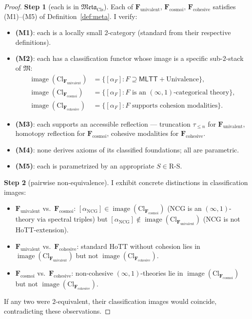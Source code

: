 \documentclass[11pt]{article}
\theoremstyle{plain}
\theoremstyle{definition}
\newcommand{\RS}{\mathrm{R\text{-}S}}
\newcommand{\fM}{\mathfrak{M}}
\newcommand{\Meta}{\mathfrak{Meta}}
\newcommand{\Cl}{\mathrm{Cl}}
\newcommand{\MLTT}{\mathsf{MLTT}}
\DeclareMathOperator{\image}{image}
\begin{document}
\begin{proof}

\textbf{Step 1} (each is in $\Meta_{\mathrm{Cls}}$). Each of $\mathbf{F}_{\mathrm{univalent}}$, $\mathbf{F}_{\mathrm{cosmoi}}$, $\mathbf{F}_{\mathrm{cohesive}}$ satisfies (M1)--(M5) of Definition~\ref{def:meta}. I verify:
\begin{itemize}
\item \textbf{(M1)}: each is a locally small $2$-category (standard from their respective definitions).
\item \textbf{(M2)}: each has a classification functor whose image is a specific sub-$2$-stack of $\fM$:
\begin{align*}
\image(\Cl_{\mathbf{F}_{\mathrm{univalent}}}) &= \{[\alpha_F] : F \supseteq \MLTT + \text{Univalence}\}, \\
\image(\Cl_{\mathbf{F}_{\mathrm{cosmoi}}}) &= \{[\alpha_F] : F \text{ is an } (\infty, 1)\text{-categorical theory}\}, \\
\image(\Cl_{\mathbf{F}_{\mathrm{cohesive}}}) &= \{[\alpha_F] : F \text{ supports cohesion modalities}\}.
\end{align*}
\item \textbf{(M3)}: each supports an accessible reflection --- truncation $\tau_{\leq n}$ for $\mathbf{F}_{\mathrm{univalent}}$, homotopy reflection for $\mathbf{F}_{\mathrm{cosmoi}}$, cohesive modalities for $\mathbf{F}_{\mathrm{cohesive}}$.
\item \textbf{(M4)}: none derives axioms of its classified foundations; all are parametric.
\item \textbf{(M5)}: each is parametrized by an appropriate $S \in \RS$.
\end{itemize}

\textbf{Step 2} (pairwise non-equivalence). I exhibit concrete distinctions in classification images:
\begin{itemize}
\item $\mathbf{F}_{\mathrm{univalent}}$ vs.\ $\mathbf{F}_{\mathrm{cosmoi}}$: $[\alpha_{\mathrm{NCG}}] \in \image(\Cl_{\mathbf{F}_{\mathrm{cosmoi}}})$ (NCG is an $(\infty, 1)$-theory via spectral triples) but $[\alpha_{\mathrm{NCG}}] \notin \image(\Cl_{\mathbf{F}_{\mathrm{univalent}}})$ (NCG is not HoTT-extension).
\item $\mathbf{F}_{\mathrm{univalent}}$ vs.\ $\mathbf{F}_{\mathrm{cohesive}}$: standard HoTT without cohesion lies in $\image(\Cl_{\mathbf{F}_{\mathrm{univalent}}})$ but not $\image(\Cl_{\mathbf{F}_{\mathrm{cohesive}}})$.
\item $\mathbf{F}_{\mathrm{cosmoi}}$ vs.\ $\mathbf{F}_{\mathrm{cohesive}}$: non-cohesive $(\infty, 1)$-theories lie in $\image(\Cl_{\mathbf{F}_{\mathrm{cosmoi}}})$ but not $\image(\Cl_{\mathbf{F}_{\mathrm{cohesive}}})$.
\end{itemize}
If any two were $2$-equivalent, their classification images would coincide, contradicting these observations.


\end{proof}
\end{document}

